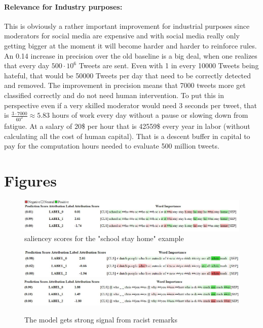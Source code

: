 \documentclass[11pt,a4paper]{article}
\begin{document}
\paragraph{Relevance for Industry purposes:}
This is obviously a rather important improvement for industrial purposes since moderators for social media are expensive and with 
social media really only getting bigger at the moment it will become harder and harder to reinforce rules.
An 0.14 increase in precision over the old baseline is a big deal, when one realizes that every day $500 \cdot 10^6$ Tweets are sent.
Even with 1 in every 10000 Tweets being hateful, that would be 50000 Tweets per day that need to be correctly detected and removed.
The improvement in precision means that 7000 tweets more get classified correctly and do not need human intervention.
To put this in perspective even if a very skilled moderator would need 3 seconds per tweet, that is 
$\frac{3 \cdot 7000}{60^2} \approx 5.83$ hours of work every day without a pause or slowing down from fatigue.
At a salary of 20\$ per hour that is 42559\$ every year in labor (without calculating all the cost of human capital).
That is a descent buffer in capital to pay for the computation hours needed to evaluate 500 million tweets.





\clearpage 
\appendix

\section{Figures}
\begin{figure}[!ht]
  \includegraphics[width=2\linewidth]{./tables-figures/school-confusion-viz.JPG} 
  \caption{saliencey scores for the "school stay home" example}
  \label{fig:school-saliency}
\end{figure}

\begin{figure}[!ht]
  \includegraphics[width=2\linewidth]{./tables-figures/white-trash-example.JPG} 
  \includegraphics[width=2\linewidth]{./tables-figures/racism-example.JPG} 
  \caption{The model gets strong signal from racist remarks}
  \label{fig:racism-example}
\end{figure}

\end{document}
